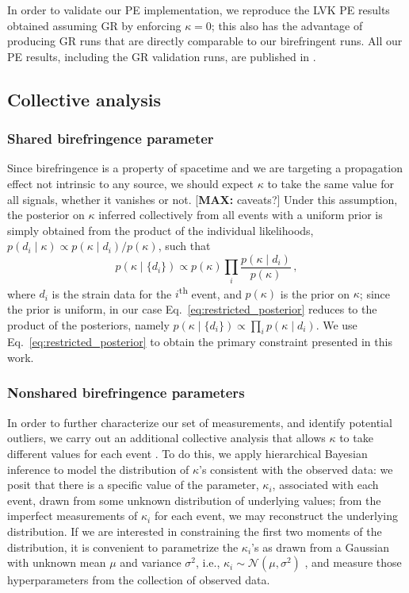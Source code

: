 \documentclass[aps,prd,twocolumn,superscriptaddress,preprintnumbers,floatfix,nofootinbib]{revtex4-2}
\newcommand*{\mi}[1]{\textsf{\color{magenta} [\textbf{MAX:} #1]}}
\begin{document}
In order to validate our \ac{PE} implementation, we reproduce the \ac{LVK} \ac{PE} results obtained assuming \ac{GR} by enforcing $\kappa = 0$; this also has the advantage of producing \ac{GR} runs that are directly comparable to our birefringent runs.
All our \ac{PE} results, including the \ac{GR} validation runs, are published in \citet{dataset}.

\subsection{Collective analysis}

\subsubsection{Shared birefringence parameter}

Since birefringence is a property of spacetime and we are targeting a propagation effect not intrinsic to any source, we should expect $\kappa$ to take the same value for all signals, whether it vanishes or not.
\mi{caveats?}
Under this assumption, the posterior on $\kappa$ inferred collectively from all events with a uniform prior is simply obtained from the product of the individual likelihoods, $p(d_i \mid \kappa) \propto p(\kappa \mid d_i)/p(\kappa)$, such that
\begin{equation}
    p(\kappa \mid \{d_i\})\propto p(\kappa) \prod_{i}\frac{p(\kappa \mid d_i)}{p(\kappa)}\,,
    \label{eq:restricted_posterior}
\end{equation}
where $d_i$ is the strain data for the $i$\textsuperscript{th} event, and $p(\kappa)$ is the prior on $\kappa$; since the prior is uniform, in our case Eq.~\eqref{eq:restricted_posterior} reduces to the product of the posteriors, namely $p(\kappa \mid \{d_i\}) \propto \prod_{i}p(\kappa \mid d_i)$.
We use Eq.~\eqref{eq:restricted_posterior} to obtain the primary constraint presented in this work.

\subsubsection{Nonshared birefringence parameters}
\label{sec:method:hier}

In order to further characterize our set of measurements, and identify potential outliers, we carry out an additional collective analysis that allows $\kappa$ to take different values for each event \cite{Zimmerman:2019wzo,Isi:2022cii}.
To do this, we apply hierarchical Bayesian inference \cite{Loredo:2004nn} to model the distribution of $\kappa$'s consistent with the observed data:
we posit that there is a specific value of the parameter, $\kappa_i$, associated with each event, drawn from some unknown distribution of underlying values; from the imperfect measurements of $\kappa_i$ for each event, we may reconstruct the underlying distribution.
If we are interested in constraining the first two moments of the distribution, it is convenient to parametrize the $\kappa_i$'s as drawn from a Gaussian with unknown mean $\mu$ and variance $\sigma^2$, i.e., $\kappa_i \sim \mathcal{N}(\mu, \sigma^2)$ \cite{Isi:2019asy}, and measure those hyperparameters from the collection of observed data.
\end{document}
